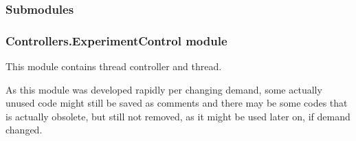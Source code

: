 \documentclass[letterpaper,10pt,english]{sphinxmanual}
\begin{document}
\subsubsection{Submodules}
\label{\detokenize{NoSeMazeController/Controllers:submodules}}

\subsubsection{Controllers.ExperimentControl module}
\label{\detokenize{NoSeMazeController/Controllers:module-Controllers.ExperimentControl}}\label{\detokenize{NoSeMazeController/Controllers:controllers-experimentcontrol-module}}
\sphinxAtStartPar
This module contains thread controller and thread.

\sphinxAtStartPar
As this module was developed rapidly per changing demand, some actually
unused code might still be saved as comments and there may be some codes that is
actually obsolete, but still not removed, as it might be used later on, if
demand changed.
\end{document}
